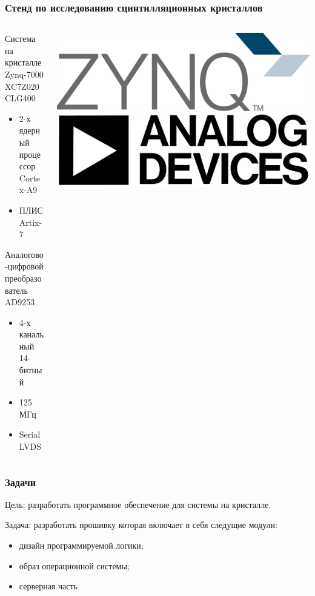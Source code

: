 \documentclass[aspectratio=169]{beamer}
\begin{document}
\begin{frame}
\frametitle{Стенд по исследованию сцинтилляционных кристаллов}
    \begin{columns}
        \begin{column}{0.7\textwidth}
        Система на кристалле Zynq-7000 XC7Z020 CLG400
            \begin{itemize}
                \item 2-х ядерный процессор Cortex-A9
                \item ПЛИС Artix-7
            \end{itemize}
        Аналогово-цифровой преобразователь AD9253
            \begin{itemize}
                \item 4-х канальный 14-битный
                \item 125 МГц
                \item Serial LVDS
            \end{itemize}
        \end{column}
        \begin{column}{0.3\textwidth}
            \includegraphics[width=\textwidth]{Zynq.jpg}
            \includegraphics[width=\textwidth]{Analog_devices.jpg}
        \end{column}
    \end{columns}
\end{frame}

\begin{frame}
\frametitle{Задачи}
    Цель: разработать программное обеспечение для системы на кристалле.\par
    Задача: разработать прошивку которая включает в себя следущие модули:
    \begin{itemize}
        \item дизайн программируемой логики; 
        \item образ операционной системы;
        \item серверная часть
    \end{itemize}
\end{frame}
\end{document}
